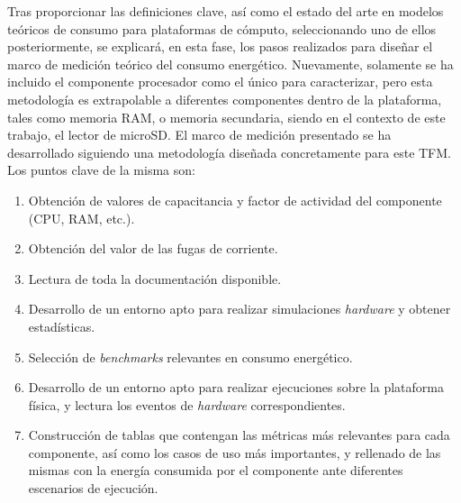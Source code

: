 Tras proporcionar las definiciones clave, así como el estado del arte en modelos teóricos de consumo para plataformas de cómputo, seleccionando uno de ellos posteriormente, se explicará, en esta fase, los pasos realizados para diseñar el marco de medición teórico del consumo energético. Nuevamente, solamente se ha incluido el componente procesador como el único para caracterizar, pero esta metodología es extrapolable a diferentes componentes dentro de la plataforma, tales como memoria \ac{RAM}, o memoria secundaria, siendo en el contexto de este trabajo, el lector de \ac{microSD}. El marco de medición presentado se ha desarrollado siguiendo una metodología diseñada concretamente para este \ac{TFM}. Los puntos clave de la misma son:

\begin{enumerate}[noitemsep]
    \item Obtención de valores de capacitancia y factor de actividad del componente (\ac{CPU}, \ac{RAM}, etc.).
    \item Obtención del valor de las fugas de corriente.
    \item Lectura de toda la documentación disponible.
    \item Desarrollo de un entorno apto para realizar simulaciones \textit{hardware} y obtener estadísticas.
    \item Selección de \textit{benchmarks} relevantes en consumo energético.
    \item Desarrollo de un entorno apto para realizar ejecuciones sobre la plataforma física, y lectura los eventos de \textit{hardware} correspondientes.
    \item Construcción de tablas que contengan las métricas más relevantes para cada componente, así como los casos de uso más importantes, y rellenado de las mismas con la energía consumida por el componente ante diferentes escenarios de ejecución.
\end{enumerate}

